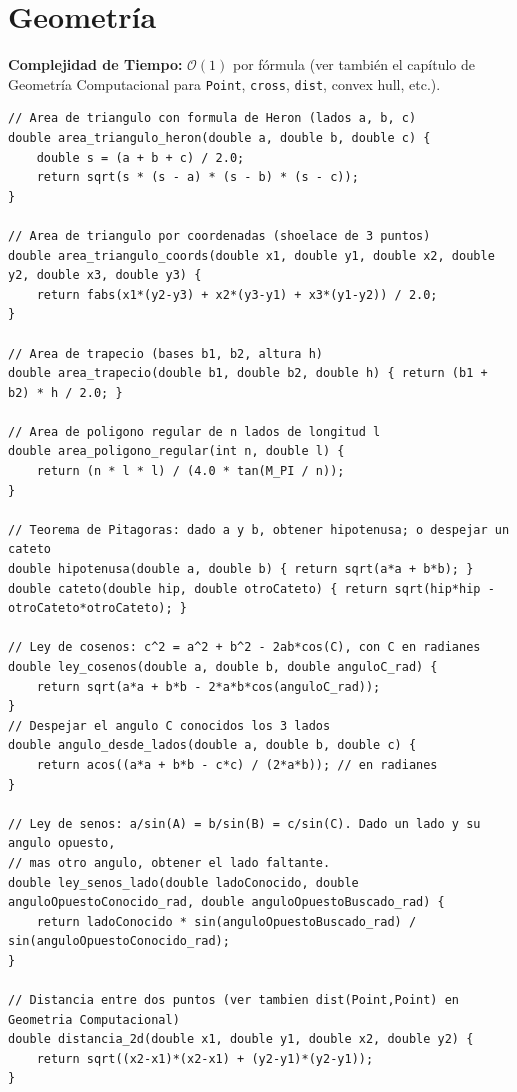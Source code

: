 \documentclass[10pt,twocolumn,letterpaper]{report}
\begin{document}
\section{Geometría}
\textbf{Complejidad de Tiempo:} $\mathcal{O}(1)$ por fórmula (ver también el capítulo de Geometría Computacional para \texttt{Point}, \texttt{cross}, \texttt{dist}, convex hull, etc.).
\begin{lstlisting}
// Area de triangulo con formula de Heron (lados a, b, c)
double area_triangulo_heron(double a, double b, double c) {
    double s = (a + b + c) / 2.0;
    return sqrt(s * (s - a) * (s - b) * (s - c));
}

// Area de triangulo por coordenadas (shoelace de 3 puntos)
double area_triangulo_coords(double x1, double y1, double x2, double y2, double x3, double y3) {
    return fabs(x1*(y2-y3) + x2*(y3-y1) + x3*(y1-y2)) / 2.0;
}

// Area de trapecio (bases b1, b2, altura h)
double area_trapecio(double b1, double b2, double h) { return (b1 + b2) * h / 2.0; }

// Area de poligono regular de n lados de longitud l
double area_poligono_regular(int n, double l) {
    return (n * l * l) / (4.0 * tan(M_PI / n));
}

// Teorema de Pitagoras: dado a y b, obtener hipotenusa; o despejar un cateto
double hipotenusa(double a, double b) { return sqrt(a*a + b*b); }
double cateto(double hip, double otroCateto) { return sqrt(hip*hip - otroCateto*otroCateto); }

// Ley de cosenos: c^2 = a^2 + b^2 - 2ab*cos(C), con C en radianes
double ley_cosenos(double a, double b, double anguloC_rad) {
    return sqrt(a*a + b*b - 2*a*b*cos(anguloC_rad));
}
// Despejar el angulo C conocidos los 3 lados
double angulo_desde_lados(double a, double b, double c) {
    return acos((a*a + b*b - c*c) / (2*a*b)); // en radianes
}

// Ley de senos: a/sin(A) = b/sin(B) = c/sin(C). Dado un lado y su angulo opuesto,
// mas otro angulo, obtener el lado faltante.
double ley_senos_lado(double ladoConocido, double anguloOpuestoConocido_rad, double anguloOpuestoBuscado_rad) {
    return ladoConocido * sin(anguloOpuestoBuscado_rad) / sin(anguloOpuestoConocido_rad);
}

// Distancia entre dos puntos (ver tambien dist(Point,Point) en Geometria Computacional)
double distancia_2d(double x1, double y1, double x2, double y2) {
    return sqrt((x2-x1)*(x2-x1) + (y2-y1)*(y2-y1));
}


\end{lstlisting}
\end{document}
